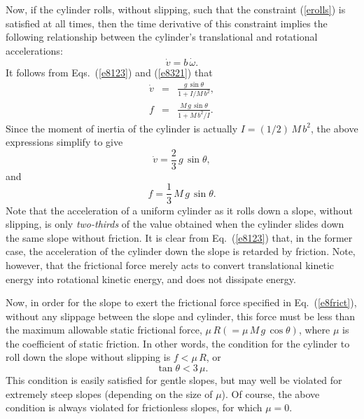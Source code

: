 Now, if the cylinder  rolls, without slipping, such that the constraint (\ref{erolls})
is satisfied at all times, then the time derivative of this constraint implies the
following relationship between the cylinder's translational and rotational accelerations:
\begin{equation}
\dot{v} = b\,\dot{\omega}.
\end{equation}
It follows from Eqs.~(\ref{e8123}) and (\ref{e8321}) that
\begin{eqnarray}\label{e8333}
\dot{v} &=& \frac{g\,\sin\theta}{1 + I/M\,b^2},\\[0.5ex]
f &=& \frac{M\,g\,\sin\theta}{1+ M\,b^2/I}.
\end{eqnarray}
Since the moment of inertia of the cylinder is actually $I=(1/2)\,M\,b^2$, the above
expressions simplify to give
\begin{equation}
\dot{v} = \frac{2}{3}\,g\,\sin\theta,
\end{equation}
and
\begin{equation}\label{e8frict}
f = \frac{1}{3}\,M\,g\,\sin\theta.
\end{equation}
Note that the acceleration of a uniform cylinder as it rolls down a slope, without
slipping, is only {\em two-thirds}
of the value obtained when the  cylinder slides down the same slope without friction.
It is clear from Eq.~(\ref{e8123}) that, in the former case, the acceleration
of the cylinder down the slope is retarded by friction. Note, however, that
the frictional force merely acts to convert translational kinetic energy into rotational
kinetic energy, and does not dissipate  energy.

Now, in order for the slope to exert the frictional force specified in Eq.~(\ref{e8frict}),
 without any slippage between the slope and cylinder, this force must
be less than the maximum allowable static frictional force, $\mu\,R (=\mu\,M\,g\,\cos\theta)$, where $\mu$ is
the coefficient of static friction. In other words, the condition for the
cylinder to roll down the slope without slipping is $f< \mu\,R$, or
\begin{equation}
\tan\theta < 3\,\mu.
\end{equation}
This condition is easily satisfied for gentle slopes, but may well be violated for
extremely steep slopes (depending on the size of  $\mu$). Of course, the above condition
is always violated for frictionless slopes, for which $\mu=0$.


